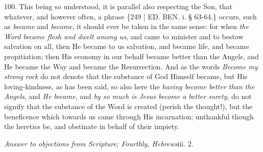 100. This being so understood,
it is parallel also respecting the Son, that whatever, and however
often, a phrase \{249 | ED. BEN. i. § 63-64.\}
occurs, such as \emph{became} and \emph{become}, it should ever be
taken in the same sense: for when \emph{the Word became flesh and dwelt
among us}, and came to minister and to bestow salvation on all,
then He became to us salvation, and became life, and became
propitiation; then His economy in our behalf became better than the
Angels, and He became the Way and became the Resurrection. And as the
words \emph{Become my strong rock} do not denote that the substance of
God Himself became, but His loving-kindness, as has been said, so also
here the \emph{having become better than the Angels}, and \emph{He became},
and \emph{by so much is Jesus become a better surety}, do not signify
that the substance of the Word is created (perish the thought!), but
the beneficence which towards us came through His incarnation;
unthankful though the heretics be, and obstinate in behalf of their
impiety.



\emph{Answer to
objections from Scripture; Fourthly, Hebrews}iii. 2.

